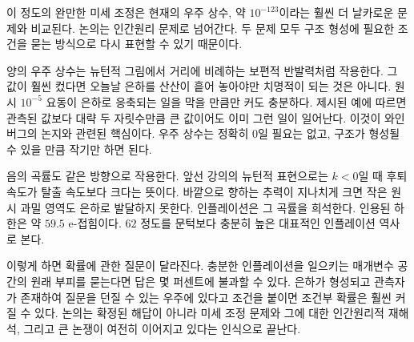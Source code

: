 \begin{classroomqa}
\end{classroomqa}

이 정도의 완만한 미세 조정은 현재의 우주 상수, 약 \(10^{-123}\)이라는 훨씬 더 날카로운 문제와 비교된다. 논의는 인간원리 문제로 넘어간다. 두 문제 모두 구조 형성에 필요한 조건을 묻는 방식으로 다시 표현할 수 있기 때문이다.

양의 우주 상수는 뉴턴적 그림에서 거리에 비례하는 보편적 반발력처럼 작용한다. 그 값이 훨씬 컸다면 오늘날 은하를 산산이 흩어 놓아야만 치명적이 되는 것은 아니다. 원시 \(10^{-5}\) 요동이 은하로 응축되는 일을 막을 만큼만 커도 충분하다. 제시된 예에 따르면 관측된 값보다 대략 두 자릿수만큼 큰 값이어도 이미 그런 일이 일어난다. 이것이 와인버그의 논지와 관련된 핵심이다. 우주 상수는 정확히 0일 필요는 없고, 구조가 형성될 수 있을 만큼 작기만 하면 된다.

음의 곡률도 같은 방향으로 작용한다. 앞선 강의의 뉴턴적 표현으로는 \(k<0\)일 때 후퇴 속도가 탈출 속도보다 크다는 뜻이다. 바깥으로 향하는 추력이 지나치게 크면 작은 원시 과밀 영역도 은하로 발달하지 못한다. 인플레이션은 그 곡률을 희석한다. 인용된 하한은 약 \(59.5\) e-접힘이다. \(62\) 정도를 문턱보다 충분히 높은 대표적인 인플레이션 역사로 본다.

이렇게 하면 확률에 관한 질문이 달라진다. 충분한 인플레이션을 일으키는 매개변수 공간의 원래 부피를 묻는다면 답은 몇 퍼센트에 불과할 수 있다. 은하가 형성되고 관측자가 존재하여 질문을 던질 수 있는 우주에 있다고 조건을 붙이면 조건부 확률은 훨씬 커질 수 있다. 논의는 확정된 해답이 아니라 미세 조정 문제와 그에 대한 인간원리적 재해석, 그리고 큰 논쟁이 여전히 이어지고 있다는 인식으로 끝난다.
